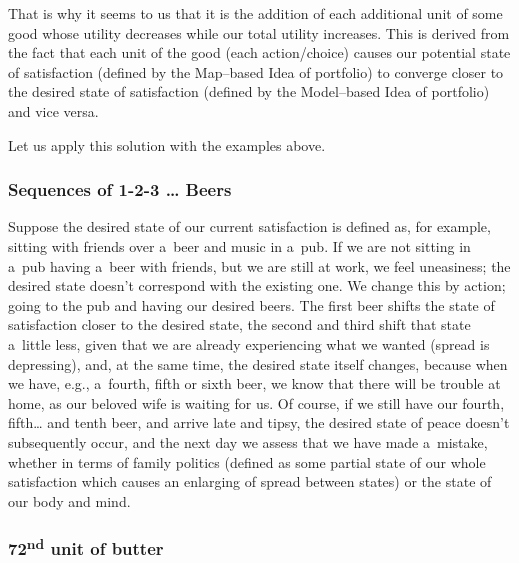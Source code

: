 That is why it seems to us that it is the addition of each additional unit of some good whose utility decreases while our total utility increases. This is derived from the fact that each unit of the good (each action/choice) causes our potential state of satisfaction (defined by the Map–based Idea of portfolio) to converge closer to the desired state of satisfaction (defined by the Model–based Idea of portfolio) and vice versa.



Let us apply this solution with the examples above.



\subsubsection*{Sequences of 1-2-3 … Beers }



Suppose the desired state of our current satisfaction is defined as, for example, sitting with friends over a~beer and music in a~pub. If we are not sitting in a~pub having a~beer with friends, but we are still at work, we feel uneasiness; the desired state doesn't correspond with the existing one. We change this by action; going to the pub and having our desired beers. The first beer shifts the state of satisfaction closer to the desired state, the second and third shift that state a~little less, given that we are already experiencing what we wanted (spread is depressing), and, at the same time, the desired state itself changes, because when we have, e.g., a~fourth, fifth or sixth beer, we know that there will be trouble at home, as our beloved wife is waiting for us. Of course, if we still have our fourth, fifth… and tenth beer, and arrive late and tipsy, the desired state of peace doesn't subsequently occur, and the next day we assess that we have made a~mistake, whether in terms of family politics (defined as some partial state of our whole satisfaction which causes an enlarging of spread between states) or the state of our body and mind.



\subsubsection*{72\textsuperscript{nd} unit of butter}



